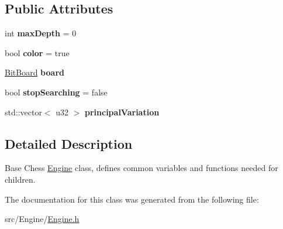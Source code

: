 \subsection*{Public Attributes}
\begin{DoxyCompactItemize}
\item 
\mbox{\label{classEngine_a1e66131e0b0661930088212610583ad7}} 
int {\bfseries max\+Depth} = 0
\item 
\mbox{\label{classEngine_a06bbc29b6477258954a6108f08e80bc2}} 
bool {\bfseries color} = true
\item 
\mbox{\label{classEngine_aae0b47bca9ae3bd3f2fefd12ab2b2455}} 
\hyperlink{classBitBoard}{Bit\+Board} {\bfseries board}
\item 
\mbox{\label{classEngine_a31fde0cdd9928f7662dab2cf88b2fb43}} 
bool {\bfseries stop\+Searching} = false
\item 
\mbox{\label{classEngine_a72f5b4117314a68b938383915ad3ef51}} 
std\+::vector$<$ u32 $>$ {\bfseries principal\+Variation}
\end{DoxyCompactItemize}


\subsection{Detailed Description}
Base Chess \hyperlink{classEngine}{Engine} class, defines common variables and functions needed for children. 

The documentation for this class was generated from the following file\+:\begin{DoxyCompactItemize}
\item 
src/\+Engine/\hyperlink{Engine_8h}{Engine.\+h}\end{DoxyCompactItemize}
